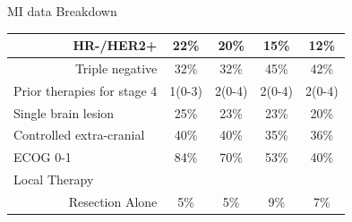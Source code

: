 \begin{frame}{MI data Breakdown}
\begin{table}[!ht]
{\begin{tabular}{|r|c|c|c|c|}
HR-/HER2+                                         & 22\%                                                                  & 20\%                                                      & 15\%                                                                     & 12\%                                                         \\ \hline
Triple negative                                   & 32\%                                                                  & 32\%                                                      & 45\%                                                                     & 42\%                                                         \\ \hline
\multicolumn{1}{|l|}{Prior therapies for stage 4} & 1(0-3)                                                                & 2(0-4)                                                    & 2(0-4)                                                                   & 2(0-4)                                                       \\ \hline
\multicolumn{1}{|l|}{Single brain lesion}         & 25\%                                                                  & 23\%                                                      & 23\%                                                                     & 20\%                                                         \\ \hline
\multicolumn{1}{|l|}{Controlled extra-cranial}    & 40\%                                                                  & 40\%                                                      & 35\%                                                                     & 36\%                                                         \\ \hline
\multicolumn{1}{|l|}{ECOG 0-1}                    & 84\%                                                                  & 70\%                                                      & 53\%                                                                     & 40\%                                                         \\ \hline
\multicolumn{1}{|l|}{Local Therapy}               &                                                                       &                                                           &                                                                          &                                                              \\ \hline
Resection Alone                                   & 5\%                                                                   & 5\%                                                       & 9\%                                                                      & 7\%                                                          \\ \hline

\end{tabular}}
\end{table}
\end{frame}

